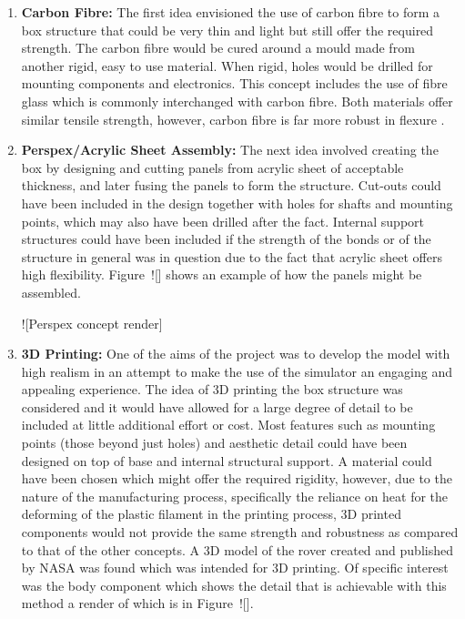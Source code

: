       \begin{enumerate}
        \item \textbf{Carbon Fibre:} The first idea envisioned the use of carbon fibre to form a box structure that could be very thin and light but still offer the required strength. The carbon fibre would be cured around a mould made from another rigid, easy to use material. When rigid, holes would be drilled for mounting components and electronics. This concept includes the use of fibre glass which is commonly interchanged with carbon fibre. Both materials offer similar tensile strength, however, carbon fibre is far more robust in flexure \cite{fibreGlast_2016}.
        
        \item \textbf{Perspex/Acrylic Sheet Assembly:} The next idea involved creating the box by designing and cutting panels from acrylic sheet of acceptable thickness, and later fusing the panels to form the structure. Cut-outs could have been included in the design together with holes for shafts and mounting points, which may also have been drilled after the fact. Internal support structures could have been included if the strength of the bonds or of the structure in general was in question due to the fact that acrylic sheet offers high flexibility. Figure~![] shows an example of how the panels might be assembled.
        
        ![Perspex concept render]
        \item \textbf{3D Printing:} One of the aims of the project was to develop the model with high realism in an attempt to make the use of the simulator an engaging and appealing experience. The idea of 3D printing the box structure was considered and it would have allowed for a large degree of detail to be included at little additional effort or cost. Most features such as mounting points (those beyond just holes) and aesthetic detail could have been designed on top of base and internal structural support. A material could have been chosen which might offer the required rigidity, however, due to the nature of the manufacturing process, specifically the reliance on heat for the deforming of the plastic filament in the printing process, 3D printed components would not provide the same strength and robustness as compared to that of the other concepts. A 3D model of the rover created and published by NASA was found which was intended for 3D printing. Of specific interest was the body component which shows the detail that is achievable with this method a render of which is in Figure~![].
        

\end{enumerate}
